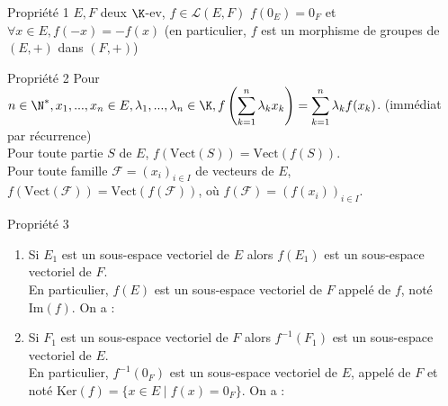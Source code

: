 \documentclass[12pt, a4paper]{report}
\begin{document}
\begin{remarque}{}
\begin{proposition}{Propriété 1}{}
$E,F$ deux $\K$-ev, $f \in \mathcal{L}(E,F)$
$f(0_E) = 0_F$ et $\forall x \in E, f(-x) = -f(x)$ (en particulier, $f$ est un morphisme de groupes de $(E,+)$ dans $(F,+)$)
\end{proposition}

\begin{proposition}{Propriété 2}{}
	Pour $n \in \N^*, x_1,...,x_n \in E, \lambda_1,...,\lambda_n \in \K, \\
	f\left(\displaystyle{\sum_{k=1}^n \lambda_kx_k}\right) = \displaystyle{\sum_{k=1}^n \lambda_k f(x_k)}$. (immédiat par récurrence) \\
	
	Pour toute partie $S$ de $E$, $f(\text{Vect}(S)) = \text{Vect}(f(S))$. \\
	Pour toute famille $\mathcal{F} = (x_i)_{i \in I}$ de vecteurs de $E$, $f(\text{Vect}(\mathcal{F})) = \text{Vect}(f(\mathcal{F}))$, où $f(\mathcal{F}) = (f(x_i))_{i \in I}$. 
\end{proposition}

\begin{proposition}{Propriété 3}{}
	\begin{enumerate}
	\item Si $E_1$ est un sous-espace vectoriel de $E$ alors $f(E_1)$ est un sous-espace vectoriel de $F$. \\
	En particulier, $f(E)$ est un sous-espace vectoriel de $F$ appelé  de $f$, noté $\text{Im}(f)$. On a : \\
	\begin{center}
	\end{center}
	\item Si $F_1$ est un sous-espace vectoriel de $F$ alors $f^{-1}(F_1)$ est un sous-espace vectoriel de $E$. \\
	En particulier, $f^{-1}(0_F)$ est un sous-espace vectoriel de $E$, appelé  de $F$ et noté $\text{Ker}(f) = \{ x \in E \mid f(x) = 0_F \}$. On a : \\
	\begin{center}
	\end{center}
	\end{enumerate}
\end{proposition}


\end{remarque}
\end{document}
